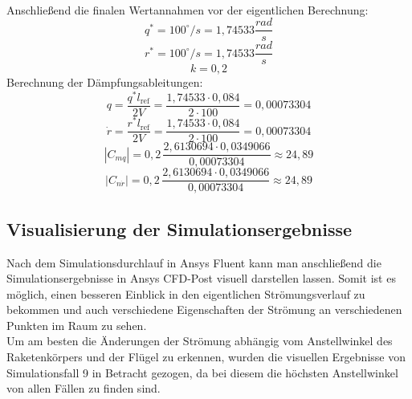 \\
Anschließend die finalen Wertannahmen vor der eigentlichen Berechnung:
\[
    q^\ast = 100^\circ/s = 1,74533\frac{rad}{s}
\]
\[
    r^\ast = 100^\circ/s = 1,74533\frac{rad}{s}
\]
\[
    k = 0,2
\] 
Berechnung der Dämpfungsableitungen:
\begin{equation}
q
=
\frac{q^\ast l_\mathrm{ref}}{2V}
=
\frac{1{,}74533 \cdot 0{,}084}{2 \cdot 100}
=
0{,}00073304
\end{equation}
\begin{equation}
\dot{r}
=
\frac{r^\ast l_\mathrm{ref}}{2V}
=
\frac{1{,}74533 \cdot 0{,}084}{2 \cdot 100}
=
0{,}00073304
\end{equation}
\begin{equation}
|C_{mq}|
=
0{,}2\,
\frac{2{,}6130694 \cdot 0{,}0349066}{0{,}00073304}
\approx 24{,}89
\end{equation}
\begin{equation}
|C_{n\dot{r}}|
=
0{,}2\,
\frac{2{,}6130694 \cdot 0{,}0349066}{0{,}00073304}
\approx 24{,}89
\end{equation}
\newpage

\subsection{Visualisierung der Simulationsergebnisse}
\label{subsec:cfd_visual_results}
Nach dem Simulationsdurchlauf in Ansys Fluent kann man anschließend die Simulationsergebnisse in Ansys CFD-Post visuell darstellen lassen. Somit ist es möglich, einen besseren Einblick in den eigentlichen Strömungsverlauf zu bekommen und auch verschiedene Eigenschaften der Strömung an verschiedenen Punkten im Raum zu sehen.
\\
Um am besten die Änderungen der Strömung abhängig vom Anstellwinkel des Raketenkörpers und der Flügel zu erkennen, wurden die visuellen Ergebnisse von Simulationsfall 9 in Betracht gezogen, da bei diesem die höchsten Anstellwinkel von allen Fällen zu finden sind.

